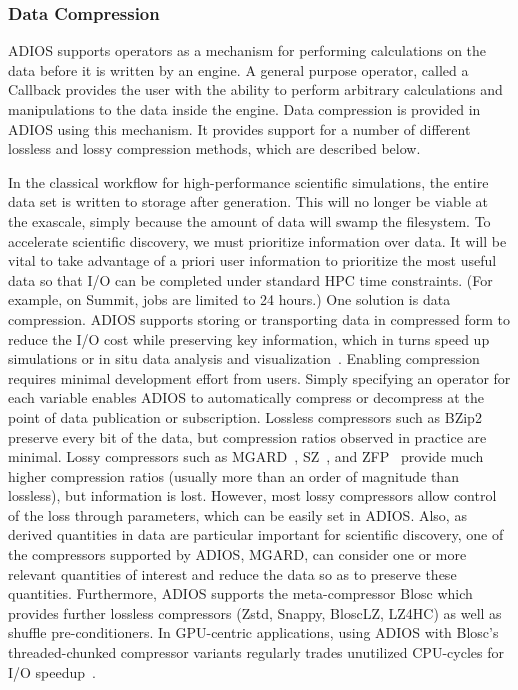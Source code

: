 \subsubsection{Data Compression}
ADIOS supports operators as a mechanism for performing calculations on the data before it is written by an engine.
A general purpose operator, called a Callback provides the user with the ability to perform arbitrary calculations and manipulations to the data inside the engine. Data compression is provided in ADIOS using this mechanism. It provides support for a number of different lossless and lossy compression methods, which are described below.

In the classical workflow for high-performance scientific simulations, the entire data set is written to storage after generation.
This will no longer be viable at the exascale, simply because the amount of data will swamp the filesystem.
To accelerate scientific discovery, we must prioritize information over data.
It will be vital to take advantage of a priori user information to prioritize the most useful data so that I/O can be completed under standard HPC time constraints.
(For example, on Summit, jobs are limited to 24 hours.)
One solution is data compression.
ADIOS supports storing or transporting data in compressed form to reduce the I/O cost while preserving key information, which in turns speed up simulations or in situ data analysis and visualization~\cite{chenunderstanding}.
Enabling compression requires minimal development effort from users.
Simply specifying an operator for each variable enables ADIOS to automatically compress or decompress at the point of data publication or subscription.
Lossless compressors such as BZip2~\cite{seward1996bzip2} preserve every bit of the data, but compression ratios observed in practice are minimal.
Lossy compressors such as MGARD~\cite{ ainsworth2018multilevel,ainsworth2019multilevel2,ainsworth2019multilevel}, SZ~\cite{di2016fast, liang2018efficient,tao2017significantly}, and ZFP~\cite{lindstrom2014fixed} provide much higher compression ratios (usually more than an order of magnitude than lossless), but information is lost.
However, most lossy compressors allow control of the loss through parameters, which can be easily set in ADIOS.
Also, as derived quantities in data are particular important for scientific discovery, one of the compressors supported by ADIOS, MGARD, can consider one or more relevant quantities of interest and reduce the data so as to preserve these quantities.
Furthermore, ADIOS supports the meta-compressor Blosc which provides further lossless compressors (Zstd, Snappy, BloscLZ, LZ4HC) as well as shuffle pre-conditioners.
In GPU-centric applications, using ADIOS with Blosc's threaded-chunked compressor variants regularly trades unutilized CPU-cycles for I/O speedup~\cite{Huebl2017}.


